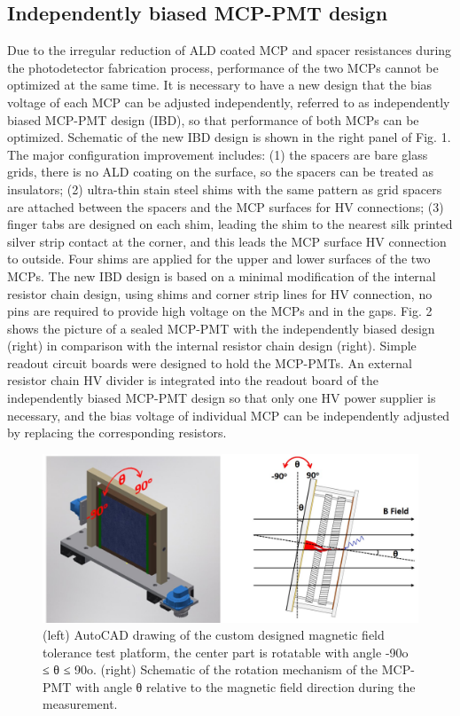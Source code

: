 \documentclass[preprint,5p]{elsarticle}
\begin{document}
\subsection{Independently biased MCP-PMT design} \label{sec_design}
Due to the irregular reduction of ALD coated MCP and spacer resistances during 
the photodetector fabrication process, performance of the two MCPs cannot be 
optimized at the same time. It is necessary to have a new design that the bias 
voltage of each MCP can be adjusted independently, referred to as independently 
biased MCP-PMT design (IBD), so that performance of both MCPs can be optimized.  
Schematic of the new IBD design is shown in the right panel of Fig. 1. The 
major configuration improvement includes: (1) the spacers are bare glass grids, 
there is no ALD coating on the surface, so the spacers can be treated as 
insulators; (2) ultra-thin stain steel shims with the same pattern as grid 
spacers are attached between the spacers and the MCP surfaces for HV 
connections; (3) finger tabs are designed on each shim, leading the shim to the 
nearest silk printed silver strip contact at the corner, and this leads the MCP 
surface HV connection to outside. Four shims are applied for the upper and 
lower surfaces of the two MCPs. The new IBD design is based on a minimal 
modification of the internal resistor chain design, using shims and corner 
strip lines for HV connection, no pins are required to provide high voltage on 
the MCPs and in the gaps. Fig. 2 shows the picture of a sealed MCP-PMT with the 
independently biased design (right) in comparison with the internal resistor 
chain design (right). Simple readout circuit boards were designed to hold the 
MCP-PMTs. An external resistor chain HV divider is integrated into the readout 
board of the independently biased MCP-PMT design so that only one HV power 
supplier is necessary, and the bias voltage of individual MCP can be 
independently adjusted by replacing the corresponding resistors. 

\begin{figure}[tbp]
\centering \includegraphics[scale=0.5]{fig/tMkmiI.jpg}
\caption{(left) AutoCAD drawing of the custom designed magnetic field tolerance 
   test platform, the center part is rotatable with angle -90o ≤ θ ≤ 90o.  
   (right) Schematic of the rotation mechanism of the MCP-PMT with angle θ 
   relative to the magnetic field direction during the measurement. } 
   \label{fig:design}
\end{figure}
\end{document}
